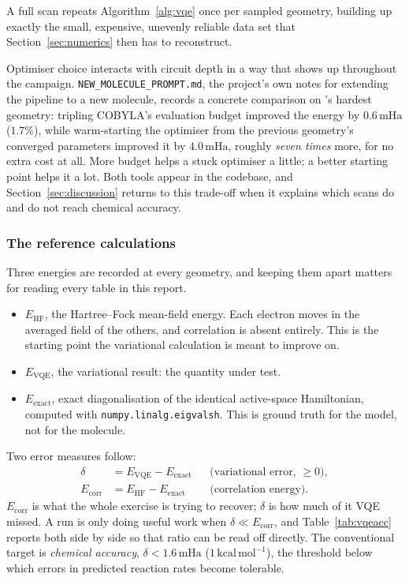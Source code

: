 \documentclass[sigconf,screen,nonacm]{acmart}
\newcommand{\mHa}{\,\text{mHa}}
\begin{document}
A full scan repeats Algorithm~\ref{alg:vqe} once per sampled geometry,
building up exactly the small, expensive, unevenly reliable data set that
Section~\ref{sec:numerics} then has to reconstruct.

Optimiser choice interacts with circuit depth in a way that shows up
throughout the campaign. \texttt{NEW\_MOLECULE\_PROMPT.md}, the project's own
notes for extending the pipeline to a new molecule, records a concrete
comparison on 's hardest geometry: tripling COBYLA's evaluation budget
improved the energy by $0.6\mHa$ ($1.7\%$), while warm-starting the optimiser
from the previous geometry's converged parameters improved it by $4.0\mHa$,
roughly \emph{seven times} more, for no extra cost at all. More budget helps
a stuck optimiser a little; a better starting point helps it a lot. Both
tools appear in the codebase, and Section~\ref{sec:discussion} returns to
this trade-off when it explains which scans do and do not reach chemical
accuracy.

\subsubsection{The reference calculations}

Three energies are recorded at every geometry, and keeping them apart matters
for reading every table in this report.

\begin{itemize}[leftmargin=1.5em]
\item $E_{\text{HF}}$, the Hartree--Fock mean-field energy. Each electron
      moves in the averaged field of the others, and correlation is absent
      entirely. This is the starting point the variational calculation is
      meant to improve on.
\item $E_{\text{VQE}}$, the variational result: the quantity under test.
\item $E_{\text{exact}}$, exact diagonalisation of the identical active-space
      Hamiltonian, computed with \texttt{numpy.linalg.eigvalsh}. This is
      ground truth for the model, not for the molecule.
\end{itemize}

Two error measures follow:
\begin{align}
\delta &= E_{\text{VQE}} - E_{\text{exact}}
   && \text{(variational error, $\geq 0$)},\\
E_{\text{corr}} &= E_{\text{HF}} - E_{\text{exact}}
   && \text{(correlation energy)} .
\end{align}
$E_{\text{corr}}$ is what the whole exercise is trying to recover; $\delta$
is how much of it VQE missed. A run is only doing useful work when $\delta
\ll E_{\text{corr}}$, and Table~\ref{tab:vqeacc} reports both side by side so
that ratio can be read off directly. The conventional target is
\emph{chemical accuracy}, $\delta < 1.6\mHa$
($1\,\text{kcal}\,\text{mol}^{-1}$), the threshold below which errors in
predicted reaction rates become tolerable.
\end{document}
